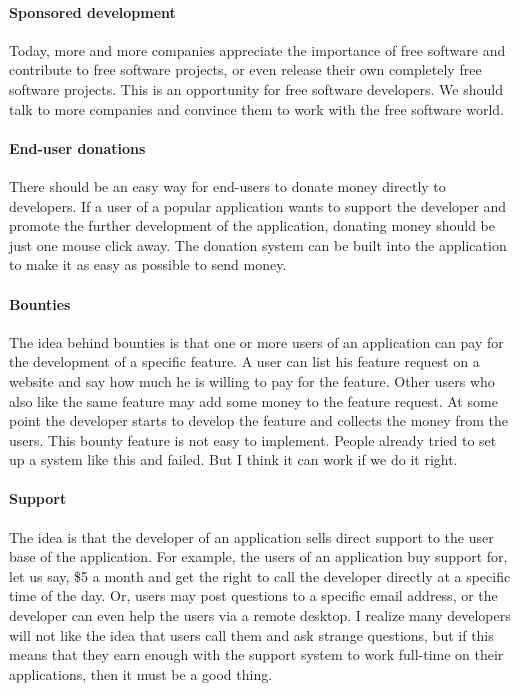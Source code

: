 \paragraph*{Sponsored development}

Today, more and more companies appreciate the importance of free software and contribute to free software projects, or even release their own completely free software projects. This is an opportunity for free software developers. We should talk to more companies and convince them to work with the free software world. 

\paragraph*{End-user donations}

There should be an easy way for end-users to donate money directly to developers. If a user of a popular application wants to support the developer and promote the further development of the application, donating money should be just one mouse click away. The donation system can be built into the application to make it as easy as possible to send money.

\paragraph*{Bounties}

The idea behind bounties is that one or more users of an application can pay for the development of a specific feature. A user can list his feature request on a website and say how much he is willing to pay for the feature. Other users who also like the same feature may add some money to the feature request. At some point the developer starts to develop the feature and collects the money from the users. This bounty feature is not easy to implement. People already tried to set up a system like this and failed. But I think it can work if we do it right. 

\paragraph*{Support}

The idea is that the developer of an application sells direct support to the user base of the application. For example, the users of an application buy support for, let us say, \$5 a month and get the right to call the developer directly at a specific time of the day. Or, users may post questions to a specific email address, or the developer can even help the users via a remote desktop. I realize many developers will not like the idea that users call them and ask strange questions, but if this means that they earn enough with the support system to work full-time on their applications, then it must be a good thing.

